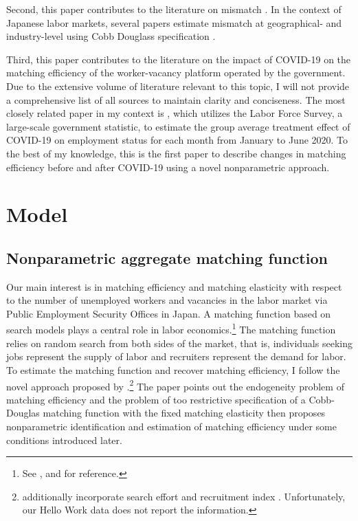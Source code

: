 \documentclass[12pt]{article}
\begin{document}
Second, this paper contributes to the literature on mismatch \cite{csahin2014mismatch}. In the context of Japanese labor markets, several papers estimate mismatch at geographical- and industry-level using Cobb Douglass specification \citep{shibata2013labor,shibata2020labor,kawata2016multi,higashi2018spatial,kawata2019,higashi2020effects,higashi2021agglomeration,higashi2023did}. 


Third, this paper contributes to the literature on the impact of COVID-19 on the matching efficiency of the worker-vacancy platform operated by the government. 
Due to the extensive volume of literature relevant to this topic, I will not provide a comprehensive list of all sources to maintain clarity and conciseness. 
The most closely related paper in my context is \cite{fukai2021describing}, which utilizes the Labor Force Survey, a large-scale government statistic, to estimate the group average treatment effect of COVID-19 on employment status for each month from January to June 2020. 
To the best of my knowledge, this is the first paper to describe changes in matching efficiency before and after COVID-19 using a novel nonparametric approach.




\section{Model}
\subsection{Nonparametric aggregate matching function}
Our main interest is in matching efficiency and matching elasticity with respect to the number of unemployed workers and vacancies in the labor market via Public Employment Security Offices in Japan.
A matching function based on search models plays a central role in labor economics.\footnote{See \cite{pissarides2000equilibrium,petrongolo2001looking}, and \cite{rogerson2005search} for reference.} 
The matching function relies on random search from both sides of the market, that is, individuals seeking jobs represent the supply of labor and recruiters represent the demand for labor.
To estimate the matching function and recover matching efficiency, I follow the novel approach proposed by \cite{lange2020beyond}.\footnote{\cite{lange2020beyond} additionally incorporate search effort \citep{mukoyama2018job} and recruitment index \citep{davis2013establishment}. Unfortunately, our Hello Work data does not report the information.}
The paper points out the endogeneity problem of matching efficiency \citep{borowczyk2013accounting} and the problem of too restrictive specification of a Cobb-Douglas matching function with the fixed matching elasticity then proposes nonparametric identification and estimation of matching efficiency under some conditions introduced later.
\end{document}
